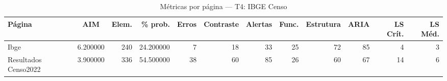 \begin{table}[htbp]
  \centering
  \caption{Métricas por página — T4: IBGE Censo}
  \label{tab:flow_t4_ibge_censo}
  \small
  \begin{tabular}{lcrrrrrrrrrr}
\toprule
Página & AIM & Elem. & \% prob. & Erros & Contraste & Alertas & Func. & Estrutura & ARIA & LS Crít. & LS Méd. \\
\midrule
Ibge & 6.200000 & 240 & 24.200000 & 7 & 18 & 33 & 25 & 72 & 85 & 4 & 3 \\
Resultados Censo2022 & 3.900000 & 336 & 54.500000 & 38 & 60 & 85 & 26 & 60 & 67 & 14 & 6 \\
\bottomrule
\end{tabular}
\end{table}
